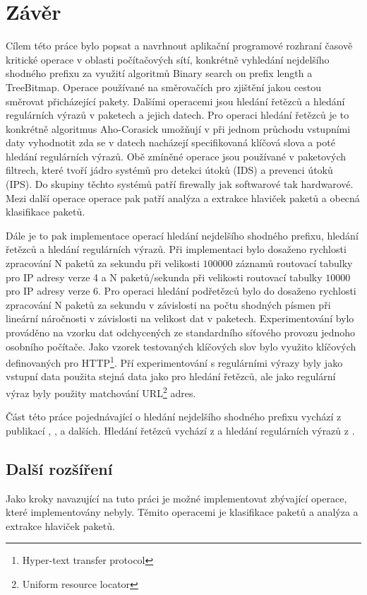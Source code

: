 \chapter{Závěr}\label{chapter:conclusion} %
Cílem této práce bylo popsat a navrhnout aplikační programové rozhraní časově kritické operace v oblasti počítačových sítí,
konkrétně vyhledání nejdelšího shodného prefixu za využití algoritmů Binary search on prefix length
a TreeBitmap. Operace používané na směrovačích pro zjištění jakou cestou směrovat přicházející pakety.
Dalšími operacemi jsou hledání řetězců a hledání regulárních výrazů v paketech a jejich datech.
Pro operaci hledání řetězců je to konkrétně algoritmus Aho-Corasick \cite{aho} umožňují v
při jednom průchodu vstupními daty vyhodnotit zda se v datech nacházejí specifikovaná klíčová slova
a poté hledání regulárních výrazů. Obě zmíněné operace jsou používané v paketových filtrech,
které tvoří jádro systémů pro detekci útoků (IDS) a prevenci útoků (IPS). Do skupiny těchto
systémů patří firewally jak softwarové tak hardwarové. Mezi další operace operace pak patří
analýza a extrakce hlaviček paketů a obecná klasifikace paketů.

Dále je to pak implementace operací hledání nejdelšího shodného prefixu, hledání řetězců
a hledání regulárních výrazů. Při implementaci bylo dosaženo rychlosti zpracování N paketů za sekundu
při velikosti $100000$ záznamů routovací tabulky pro IP adresy verze 4 a N paketů/sekunda při velikosti
routovací tabulky $10000$ pro IP adresy verze 6. Pro operaci hledání podřetězců bylo
do dosaženo rychlosti zpracování N paketů za sekundu v závislosti na počtu shodných písmen
při lineární náročnosti v závislosti na velikost dat v paketech. Experimentování bylo prováděno
na vzorku dat odchycených ze standardního síťového provozu jednoho osobního počítače. Jako vzorek
testovaných klíčových slov bylo využito klíčových definovaných pro HTTP\footnote{Hyper-text transfer protocol}.
Pří experimentování s regulárními výrazy byly jako vstupní data použita stejná data jako pro hledání řetězců,
ale jako regulární výraz byly použity matchování URL\footnote{Uniform resource locator} adres.

Část této práce pojednávající o hledání nejdelšího shodného prefixu vychází z publikací
\cite{tbm}, \cite{bspl}, a dalších. Hledání řetězců vychází z \cite{aho} a hledání regulárních výrazů
 z \cite{meduna}.

\section{Další rozšíření} %
Jako kroky navazující na tuto práci je možné implementovat zbývající operace, které implementovány nebyly.
Těmito operacemi je klasifikace paketů a analýza a extrakce hlaviček paketů.

